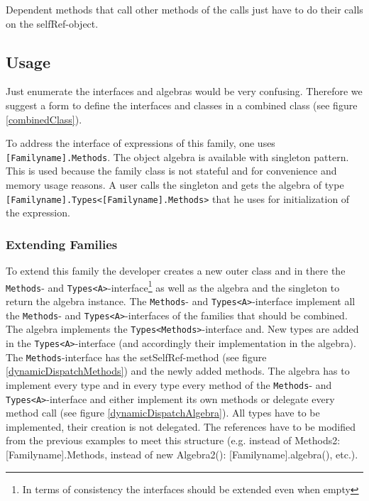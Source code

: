 \documentclass{report}
\begin{document}
Dependent methods that call other methods of the calls just have to do their calls on the selfRef-object.

\subsection{Usage}
\label{combiningTheParts}
Just enumerate the interfaces and algebras would be very confusing. Therefore we suggest a form to define the interfaces and classes in a combined class (see figure \ref{combinedClass}).

To address the interface of expressions of this family, one uses \lstinline{[Familyname].Methods}. The object algebra is available with singleton pattern. This is used because the family class is not stateful and for convenience and memory usage reasons. A user calls the singleton and gets the algebra of type \lstinline{[Familyname].Types<[Familyname].Methods>} that he uses for initialization of the expression.

\subsubsection*{Extending Families}

To extend this family the developer creates a new outer class and in there the \lstinline{Methods}- and \lstinline{Types<A>}-interface\footnote{In terms of consistency the interfaces should be extended even when empty} as well as the algebra and the singleton to return the algebra instance. The \lstinline{Methods}- and \lstinline{Types<A>}-interface implement all the \lstinline{Methods}- and \lstinline{Types<A>}-interfaces of the families that should be combined. The algebra implements the \lstinline{Types<Methods>}-interface and. New types are added in the \lstinline{Types<A>}-interface (and accordingly their implementation in the algebra). The \lstinline{Methods}-interface has the setSelfRef-method (see figure \ref{dynamicDispatchMethods}) and the newly added methods. The algebra has to implement every type and in every type every method of the \lstinline{Methods}- and \lstinline{Types<A>}-interface and either implement its own methods or delegate every method call (see figure \ref{dynamicDispatchAlgebra}). All types have to be implemented, their creation is not delegated. The references have to be modified from the previous examples to meet this structure (e.g. instead of Methods2: [Familyname].Methods, instead of new Algebra2(): [Familyname].algebra(), etc.).
\end{document}
